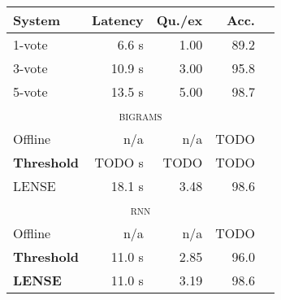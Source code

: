\begin{tabular}[b]{l  r  r  r  r}
    \textbf{System} & \textbf{Latency} & \textbf{Qu./ex} & \textbf{Acc.} \\ \hline
    1-vote & 6.6 s & 1.00 & 89.2 \\ %
    3-vote & 10.9 s & 3.00 & 95.8 \\ %
    5-vote & 13.5 s & 5.00 & 98.7 \\ %
    \multicolumn{5}{c}{\textsc{bigrams}} \\ \hline
    Offline & n/a & n/a & TODO \\ %
    \textbf{Threshold} & TODO s & TODO & TODO \\ %
    LENSE & 18.1 s & 3.48 & 98.6 \\ %
    \multicolumn{5}{c}{\textsc{rnn}} \\ \hline
    Offline & n/a & n/a & TODO \\ %
    \textbf{Threshold} & 11.0 s & 2.85 & 96.0 \\ %
    \textbf{LENSE} & 11.0 s & 3.19 & 98.6 \\%
\end{tabular}
